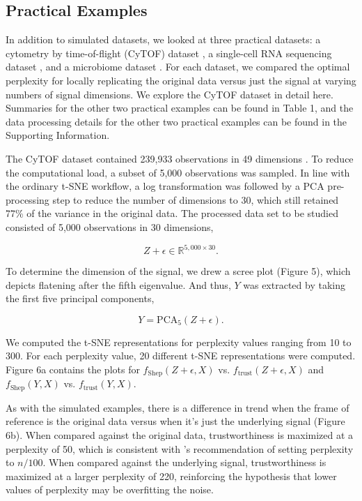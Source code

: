 \documentclass{article}
\begin{document}
\subsection{Practical Examples}
In addition to simulated datasets, we looked at three practical datasets: a cytometry by time-of-flight (CyTOF) dataset \cite{CyTOF data}, a single-cell RNA sequencing dataset \cite{scRNA data}, and a microbiome dataset \cite{enterotype data}. For each dataset, we compared the optimal perplexity for locally replicating the original data versus just the signal at varying numbers of signal dimensions. We explore the CyTOF dataset in detail here. Summaries for the other two practical examples can be found in Table 1, and the data processing details for the other two practical examples can be found in the Supporting Information.

The CyTOF dataset contained 239,933 observations in 49 dimensions \cite{CyTOF data}. To reduce the computational load, a subset of 5,000 observations was sampled. In line with the ordinary t-SNE workflow, a log transformation was followed by a PCA pre-processing step to reduce the number of dimensions to 30, which still retained 77\% of the variance in the original data. The processed data set to be studied consisted of 5,000 observations in 30 dimensions, \begin{linenomath}$$Z + \epsilon \in \mathbb{R}^{5,000 \times 30}.$$\end{linenomath}  To determine the dimension of the signal, we drew a scree plot (Figure 5), which depicts flatening after the fifth eigenvalue. And thus, $Y$ was extracted by taking the first five principal components, \begin{linenomath}$$Y = \textrm{PCA}_5(Z + \epsilon).$$\end{linenomath} We computed the t-SNE representations for perplexity values ranging from 10 to 300. For each perplexity value, 20 different t-SNE representations were computed. Figure 6a contains the plots for $f_\textrm{Shep}(Z + \epsilon, X)$ vs. $f_\textrm{trust}(Z + \epsilon, X)$ and $f_\textrm{Shep}(Y, X)$ vs. $f_\textrm{trust}(Y, X)$.

As with the simulated examples, there is a difference in trend when the frame of reference is the original data versus when it's just the underlying signal (Figure 6b). When compared against the original data, trustworthiness is maximized at a perplexity of 50, which is consistent with \cite{t-SNE cell}'s recommendation of setting perplexity to $n/100$. When compared against the underlying signal, trustworthiness is maximized at a larger perplexity of 220, reinforcing the hypothesis that lower values of perplexity may be overfitting the noise. 
\end{document}
